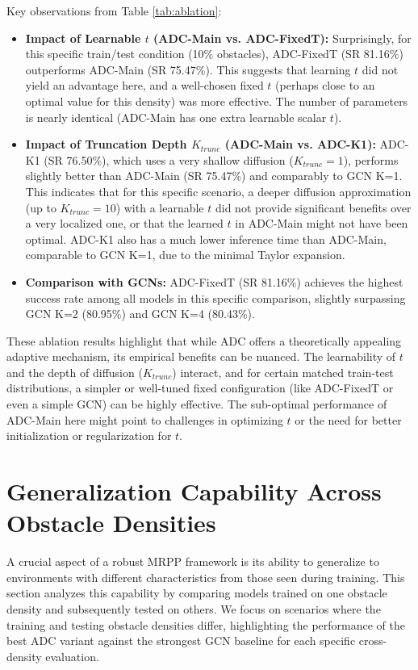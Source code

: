 Key observations from Table \ref{tab:ablation}:
\begin{itemize}
    \item \textbf{Impact of Learnable $t$ (ADC-Main vs. ADC-FixedT):} Surprisingly, for this specific train/test condition (10\% obstacles), ADC-FixedT (SR 81.16\%) outperforms ADC-Main (SR 75.47\%). This suggests that learning $t$ did not yield an advantage here, and a well-chosen fixed $t$ (perhaps close to an optimal value for this density) was more effective. The number of parameters is nearly identical (ADC-Main has one extra learnable scalar $t$).
    \item \textbf{Impact of Truncation Depth $K_{trunc}$ (ADC-Main vs. ADC-K1):} ADC-K1 (SR 76.50\%), which uses a very shallow diffusion ($K_{trunc}=1$), performs slightly better than ADC-Main (SR 75.47\%) and comparably to GCN K=1. This indicates that for this specific scenario, a deeper diffusion approximation (up to $K_{trunc}=10$) with a learnable $t$ did not provide significant benefits over a very localized one, or that the learned $t$ in ADC-Main might not have been optimal. ADC-K1 also has a much lower inference time than ADC-Main, comparable to GCN K=1, due to the minimal Taylor expansion.
    \item \textbf{Comparison with GCNs:} ADC-FixedT (SR 81.16\%) achieves the highest success rate among all models in this specific comparison, slightly surpassing GCN K=2 (80.95\%) and GCN K=4 (80.43\%).
\end{itemize}
These ablation results highlight that while ADC offers a theoretically appealing adaptive mechanism, its empirical benefits can be nuanced. The learnability of $t$ and the depth of diffusion ($K_{trunc}$) interact, and for certain matched train-test distributions, a simpler or well-tuned fixed configuration (like ADC-FixedT or even a simple GCN) can be highly effective. The sub-optimal performance of ADC-Main here might point to challenges in optimizing $t$ or the need for better initialization or regularization for $t$.

\section{Generalization Capability Across Obstacle Densities}
\label{sec:generalization_detailed}
A crucial aspect of a robust MRPP framework is its ability to generalize to environments with different characteristics from those seen during training. This section analyzes this capability by comparing models trained on one obstacle density and subsequently tested on others. We focus on scenarios where the training and testing obstacle densities differ, highlighting the performance of the best ADC variant against the strongest GCN baseline for each specific cross-density evaluation.

